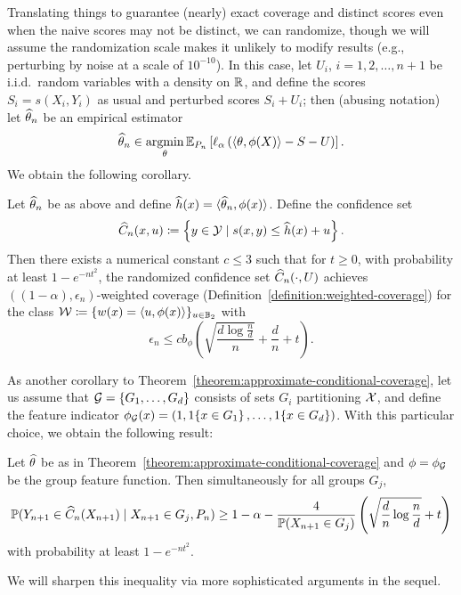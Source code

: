 \documentclass[11pt]{article}
\newcommand{\radphi}{b_{\phi}}
\newcommand{\loss}{\ell}
\newcommand{\scorefunc}{s}
\newcommand{\scoreval}{\scorefunc}
\newcommand{\scorerv}{S}
\begin{document}
Translating things to guarantee (nearly) exact coverage and distinct scores
even when the naive scores may not be distinct, we can
randomize, though we will assume the randomization scale makes it unlikely
to modify results (e.g., perturbing by noise at a scale of $10^{-10}$).
%
In this case, let $U_i$, $i = 1, 2, \ldots, n + 1$ be i.i.d.\ random
variables with a density on $\mathbb{R}$, and define the scores $\scorerv_i =
\scoreval(X_i, Y_i)$ as usual and perturbed scores $\scorerv_i + U_i$; then
(abusing notation) let $\widehat{\theta}_n$ be an empirical estimator
\begin{equation*}
  \what{\theta}_n \in \argmin_{\theta} \E_{P_n}\left[\loss_\alpha\left(
    \<\theta, \phi(X)\> - \scorerv - U \right)\right].
\end{equation*}
We obtain the following corollary.
\begin{corollary}
  Let $\widehat{\theta}_n$ be as above and define
  $\widehat{h}(x) = \langle\widehat{\theta}_n, \phi(x)\rangle$. Define the
  confidence set
  \begin{equation*}
    \what{C}_n(x, u) \defeq \left\{y \in \mc{Y} \mid \scoreval(x, y)
    \le \what{h}(x) + u \right\}.
  \end{equation*}
  Then there exists a numerical constant $c \le 3$
  such that for
  $t \ge 0$, with probability at least $1 - e^{-n t^2}$,
  the randomized confidence set $\widehat{C}_n(\cdot, U)$ achieves
  $((1 - \alpha), \epsilon_n)$-weighted coverage
  (Definition~\ref{definition:weighted-coverage})
  for the class $\mathcal{W} \coloneqq \{w(x) = \langle u, \phi(x)\rangle\}_{u \in \mathbb{B}_2}$
  with
  \begin{equation*}
    \epsilon_n \le c \radphi \left(
    \sqrt{\frac{d \log \frac{n}{d}}{n}}
    + \frac{d}{n} + t \right).
  \end{equation*}
\end{corollary}

As another corollary to
Theorem~\ref{theorem:approximate-conditional-coverage}, let us assume that
$\mathcal{G} = \{G_1, \ldots, G_d\}$ consists of sets $G_i$ partitioning
$\mathcal{X}$, and define the
feature indicator $\phi_{\mathcal{G}}(x) = (1, 1\!\left\{x \in G_1\right\}, \ldots, 1\!\left\{x \in
  G_d\right\})$. With
this particular choice, we obtain the following result:
\begin{corollary}
  \label{corollary:group-conditional-baby}
  Let $\widehat{\theta}$ be as in
  Theorem~\ref{theorem:approximate-conditional-coverage}
  and $\phi = \phi_{\mathcal{G}}$ be the group feature function.
  Then simultaneously for all groups $G_j$,
  \begin{equation*}
    \mathbb{P}(Y_{n + 1} \in \widehat{C}_n(X_{n + 1}) \mid X_{n + 1} \in G_j, P_n)
    \ge 1 - \alpha - \frac{4}{\mathbb{P}(X_{n + 1} \in G_j)}
    \left(\sqrt{\frac{d}{n} \log \frac{n}{d}} + t \right)
  \end{equation*}
  with probability at least $1 - e^{-nt^2}$.
\end{corollary}
\noindent
We will sharpen this inequality via more sophisticated
arguments in the sequel.
\end{document}
